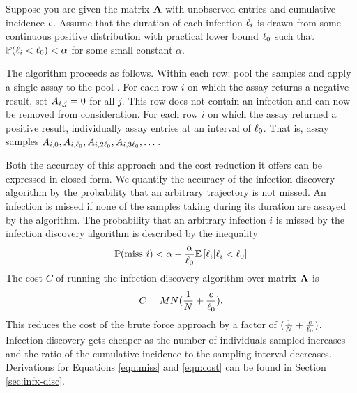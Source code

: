 Suppose you are given the matrix $\mathbf{A}$ with unobserved entries and cumulative incidence $c$.
Assume that the duration of each infection $\ell_i$ is drawn from some continuous positive distribution with practical lower bound $\ell_0$ such that $\mathbb{P}(\ell_i < \ell_0) < \alpha$ for some small constant $\alpha$.

The algorithm proceeds as follows. 
Within each row: pool the samples and apply a single assay to the pool . 
For each row $i$ on which the assay returns a negative result, set $A_{i,j} = 0$ for all $j$.
This row does not contain an infection and can now be removed from consideration.
For each row $i$ on which the assay returned a positive result, individually assay entries at an interval of $\ell_0$.
That is, assay samples $A_{i,0}, A_{i,\ell_0}, A_{i,2\ell_0}, A_{i,3\ell_0}, \dots$. 

Both the accuracy of this approach and the cost reduction it offers can be expressed in closed form.
We quantify the accuracy of the infection discovery algorithm by the probability that an arbitrary trajectory is not missed.
An infection is missed if none of the samples taking during its duration are assayed by the algorithm.
The probability that an arbitrary infection $i$ is missed by the infection discovery algorithm is described by the inequality
\begin{equation}\label{eqn:miss}
    \mathbb{P}(\text{miss } i) < \alpha - \frac{\alpha}{\ell_0} \mathbb{E} \left[ \ell_i | \ell_i < \ell_0  \right]
\end{equation}
The cost $C$ of running the infection discovery algorithm over matrix $\mathbf{A}$ is 
\begin{equation}\label{eqn:cost}
    C = M N (\frac{1}{N} + \frac{c}{\ell_0}).
\end{equation}
This reduces the cost of the brute force approach by a factor of $(\frac{1}{N} + \frac{c}{\ell_0})$.
Infection discovery gets cheaper as the number of individuals sampled increases and the ratio of the cumulative incidence to the sampling interval decreases.
Derivations for Equations \ref{eqn:miss} and \ref{eqn:cost} can be found in Section \ref{sec:infx-disc}.


